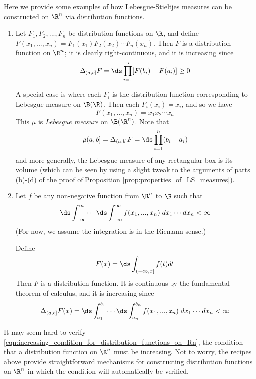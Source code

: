 \documentclass{article} %
\begin{document}
Here we provide some examples of how Lebesgue-Stieltjes measures can be constructed on $\R^n$ via distribution functions.

\begin{enumerate}
\item Let $F_1,F_2,...,F_n$ be distribution functions on $\R$, and define $F(x_1,...,x_n) = F_1(x_1) F_2(x_2) \cdots F_n(x_n)$.  Then $F$ is a distribution function on $\R^n$; it is clearly right-continuous, and it is increasing since
\[ \Delta_{(a,b]} F =\ds\prod_{i=1}^n [F(b_i) - F(a_i)] \geq 0 \]
	
A special case is where each $F_i$ is the distribution function corresponding to Lebesgue measure on $\B(\R)$.  Then each $F_i(x_i) = x_i$, and so we have
\[ F(x_1,...,x_n) = x_1x_2 \cdots x_n\]
This $\mu$ is \textit{Lebesgue measure} on $\B(\R^n)$.  Note that 
\[ \mu(a,b] = \Delta_{(a,b]} F = \ds\prod_{i=1}^n (b_i-a_i) \]
and more generally, the Lebesgue measure of any rectangular box is its volume (which can be seen by using a slight tweak to the arguments of parts (b)-(d) of the proof of Proposition \ref{prop:properties_of_LS_measures}). 
\item Let $f$ be any non-negative function from $\R^n$ to $\R$ such that 
\[ \ds\int_{-\infty}^\infty \cdots  \ds\int_{-\infty}^\infty f(x_1,...,x_n) \; dx_1 \cdots dx_n < \infty \]
(For now, we assume the integration is in the Riemann sense.)

Define 
\[ F(x) = \ds\int_{(-\infty,x]} f(t) dt \]
Then $F$ is a distribution function. It is continuous by the fundamental theorem of calculus, and it is increasing since
\[ \Delta_{(a,b]} F(x) = \ds\int_{a_1}^{b_1} \cdots  \ds\int_{a_n}^{b_n} f(x_1,...,x_n) \; dx_1 \cdots dx_n < \infty \]  
\end{enumerate}


\begin{remark}

It may seem hard to verify \eqref{eqn:increasing_condition_for_distribution_functions_on_Rn}, the condition that a distribution function on $\R^n$ must be increasing.  Not to worry, the recipes above provide straightforward mechanisms for constructing distribution functions on $\R^n$ in which the condition will automatically be verified.
\end{remark}
\end{document}
